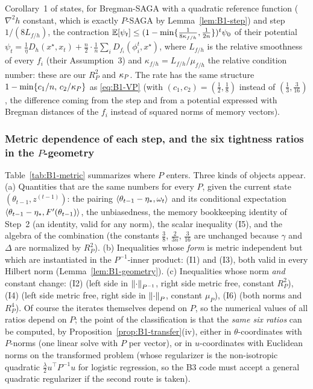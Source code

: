 \begin{remark}\label{rem:B1-dragomir}
Corollary~1 of \cite{dragomir2021fast} states, for Bregman-SAGA with a quadratic reference function
($\nabla^2h$ constant, which is exactly $P$-SAGA by Lemma~\ref{lem:B1-step}) and step $1/(8L_{f/h})$,
the contraction $\mathbb{E}[\psi_t]\le(1-\min\{\frac{1}{8\kappa_{f/h}},\frac1{2n}\})^t\psi_0$ of their potential
$\psi_t=\frac1{\eta}D_h(x^\star,x_t)+\frac n2\cdot\frac1n\sum_iD_{f_i}(\phi_i^t,x^\star)$, where
$L_{f/h}$ is the relative smoothness of every $f_i$ (their Assumption~3) and
$\kappa_{f/h}=L_{f/h}/\mu_{f/h}$ the relative condition number: these are our $R_P^2$ and $\kappa_P$. The
rate has the same structure $1-\min\{c_1/n,\,c_2/\kappa_P\}$ as \eqref{eq:B1-VP} (with $(c_1,c_2)=(\frac12,\frac18)$
instead of $(\frac13,\frac3{16})$, the difference coming from the step and from a potential expressed with
Bregman distances of the $f_i$ instead of squared norms of memory vectors).
\end{remark}

\subsubsection{Metric dependence of each step, and the six tightness ratios in the \texorpdfstring{$P$}{P}-geometry}
\label{sec:B1-ratios}

Table~\ref{tab:B1-metric} summarizes where $P$ enters. Three kinds of objects appear.
(a) Quantities that are the same numbers for every $P$, given the current state $(\theta_{t-1},z^{(t-1)})$:
the pairing $\left\langle \theta_{t-1}-\eta_\ast, \omega_t \right\rangle$ and its conditional expectation
$\left\langle \theta_{t-1}-\eta_\ast, F'(\theta_{t-1}) \right\rangle$, the unbiasedness, the memory bookkeeping identity of
Step~2 (an identity, valid for any norm), the scalar inequality (I5), and the algebra of the combination
(the constants $\frac38$, $\frac2{3n}$, $\frac3{16}$ are unchanged because $\gamma$ and $\Delta$ are
normalized by $R_P^2$). (b) Inequalities whose \emph{form} is metric independent but which are instantiated
in the $P^{-1}$-inner product: (I1) and (I3), both valid in every Hilbert norm (Lemma~\ref{lem:B1-geometry}).
(c) Inequalities whose norm \emph{and} constant change: (I2) (left side in $\left\|\cdot\right\|_{P^{-1}}$, right
side metric free, constant $R_P^2$), (I4) (left side metric free, right side in $\left\|\cdot\right\|_P$, constant
$\mu_P$), (I6) (both norms and $R_P^4$). Of course the iterates themselves depend on $P$, so the numerical
values of all ratios depend on $P$; the point of the classification is that the \emph{same six ratios} can
be computed, by Proposition~\ref{prop:B1-transfer}(iv), either in $\theta$-coordinates with $P$-norms (one
linear solve with $P$ per vector), or in $u$-coordinates with Euclidean norms on the transformed problem
(whose regularizer is the non-isotropic quadratic $\frac\lambda2u^\top P^{-1}u$ for logistic regression,
so the B3 code must accept a general quadratic regularizer if the second route is taken).

